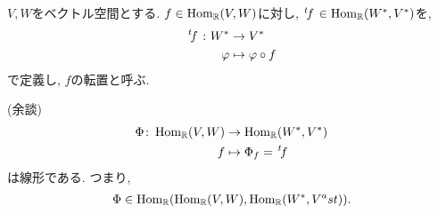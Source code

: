 \begin{definition}
  $V,W$をベクトル空間とする.
  $f\in \operatorname{Hom}_{\mathbb{R}}(V,W)$に対し,
  $\left.^{t}\!f\right.\in \operatorname{Hom}_{\mathbb{R}}(W^\ast,V^\ast)$を,
  \begin{align*}
    \left.^{t}\!f\right.\colon W^\ast &\to V^\ast\\
    \varphi &\mapsto \varphi\circ f
  \end{align*}
  で定義し, $f$の転置と呼ぶ.
\end{definition}

(余談)
\begin{align*}
  \Phi\colon \operatorname{Hom}_{\mathbb{R}}(V,W)&\to \operatorname{Hom}_{\mathbb{R}}(W^\ast,V^\ast)  \\
  f&\mapsto \Phi_f=\left.^{t}\!f\right.
\end{align*}
は線形である.
つまり,
\begin{align*}
  \Phi\in\operatorname{Hom}_{\mathbb{R}}(\operatorname{Hom}_{\mathbb{R}}(V,W),\operatorname{Hom}_{\mathbb{R}}(W^\ast,V^ast)).
\end{align*}
